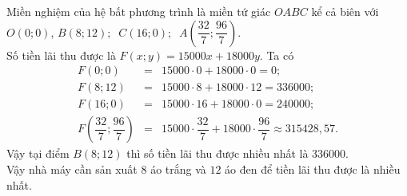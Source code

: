 \begin{bt}
{\begin{center}
\end{center}
Miền nghiệm của hệ bất phương trình là miền tứ giác $OABC$ kể cả biên với $O\left(0;0\right)$, $B\left(8;12\right);\ $ $C\left(16;0\right);\ $ $A\left(\dfrac{32}{7};\dfrac{96}{7}\right)$.\\
Số tiền lãi thu được là $F(x;y)=15000x+18000y$. Ta có 
\begin{eqnarray*}
F(0;0)&=&15000\cdot 0+18000\cdot 0 = 0;\\
F(8;12)&=&15000\cdot 8+18000\cdot 12=336000;\\
F(16;0)&=&15000\cdot 16+18000\cdot 0 = 240000;\\
F\left(\dfrac{32}{7};\dfrac{96}{7}\right)&=&15000\cdot\dfrac{32}{7}+18000\cdot\dfrac{96}{7} \approx 315428{,}57.
\end{eqnarray*}
Vậy tại điểm $B\left(8;12\right)$ thì số tiền lãi thu được nhiều nhất là $336000$.\\
Vậy nhà máy cần sản xuất $8$ áo trắng và $12$ áo đen để tiền lãi thu được là nhiều nhất.}
\end{bt}


